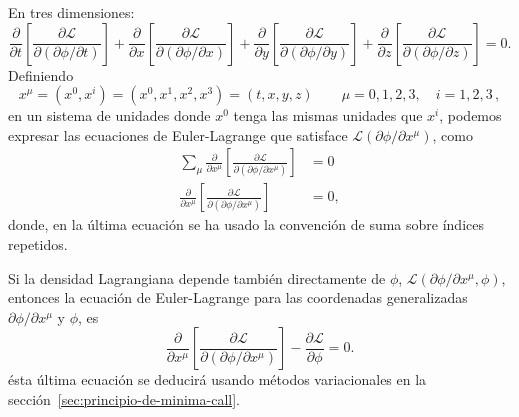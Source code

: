 En tres dimensiones:
\begin{equation}
  \label{eq:eelcalls1m}
\frac{\partial}{\partial t}
  \left[
    \frac{\partial\mathcal{L}}{\partial
      (\partial\phi/\partial t)}
  \right]+\frac{\partial}{\partial x}
  \left[
    \frac{\partial\mathcal{L}}{\partial
      (\partial\phi/\partial x)}
  \right]+\frac{\partial}{\partial y}
  \left[
    \frac{\partial\mathcal{L}}{\partial
      (\partial\phi/\partial y)}
  \right]+\frac{\partial}{\partial z}
  \left[
    \frac{\partial\mathcal{L}}{\partial
      (\partial\phi/\partial z)}
  \right]=0.
\end{equation}
Definiendo
\begin{equation}
  \label{eq:xmu}
  x^\mu=(x^0,x^i)=(x^0,x^1,x^2,x^3)=(t,x,y,z) \qquad \mu=0,1,2,3,\quad i=1,2,3\,,
\end{equation}
en un sistema de unidades donde $x^0$ tenga las mismas unidades que
$x^i$, podemos expresar las ecuaciones de Euler-Lagrange que satisface
$\mathcal{L}(\partial\phi/\partial x^\mu)$, como
\begin{align*}
 \sum_\mu\frac{\partial}{\partial x^\mu}
  \left[
    \frac{\partial\mathcal{L}}{\partial
      (\partial\phi/\partial x^\mu)}
  \right]&=0\\
 \frac{\partial}{\partial x^\mu}
  \left[
    \frac{\partial\mathcal{L}}{\partial
      (\partial\phi/\partial x^\mu)}
  \right]&=0,
\end{align*}
donde, en la última ecuación se ha usado la convención de suma sobre
índices repetidos. 

Si la densidad Lagrangiana depende también directamente de $\phi$,
$\mathcal{L}(\partial\phi/\partial x^\mu,\phi)$, entonces la ecuación de Euler-Lagrange para
las coordenadas generalizadas  $\partial\phi/\partial x^\mu$ y $\phi$, es
\begin{equation}
\label{eq:eelcallf}
 \frac{\partial}{\partial x^\mu}
  \left[
    \frac{\partial\mathcal{L}}{\partial
      (\partial\phi/\partial x^\mu)}
  \right]-\frac{\partial\mathcal{L}}{\partial\phi}=0.
\end{equation}
ésta última ecuación se deducirá usando métodos variacionales en la
sección~\ref{sec:principio-de-minima-call}.

